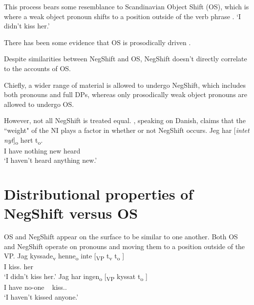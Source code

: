 \documentclass[12pt, letterpaper]{article}
\begin{document}
\ex This process bears some resemblance to Scandinavian Object Shift (OS), which is where a weak object pronoun shifts to a position outside of the verb phrase \citep{holmbergWordOrderSyntactic1986,holmbergRemarksHolmbergGeneralization1999}.
	 
	\glt `I didn't kiss her.'
	\z 

\ex There has been some evidence that OS is prosodically driven \citep{erteschik-shirSoundPatternsSyntax2005,erteschik-shirScandinavianObjectShift2017,erteschik-shirVariationMainlandScandinavian2020,brinkerhoffMATCHINGPhrasesNorwegian2021}. 

\ex Despite similarities between NegShift and OS, NegShift doesn't directly correlate to the accounts of OS. 

\ex Chiefly, a wider range of material is allowed to undergo NegShift, which includes both pronouns and full DPs, whereas only prosodically weak object pronouns are allowed to undergo OS.

\ex However, not all NegShift is treated equal. \citet[65f]{christensenInterfacesNegationSyntax2005}, speaking on Danish, claims that the ``weight" of the NI plays a factor in whether or not NegShift occurs. 
	\ea
	\gll Jeg har [\textit{intet} \textit{nyt}]\textsubscript{o} hørt t\textsubscript{o}.\\
	I have nothing new heard\\
	\glt `I haven't heard anything new.'
	\z
\z 

\section{Distributional properties of NegShift versus OS} \label{sec:ENGELS}

\ea OS and NegShift appear on the surface to be similar to one another. 
\ex Both OS and NegShift operate on pronouns and moving them to a position outside of the VP. 
	\ea \label{ex:OS}
		\gll Jag kyssade\textsubscript{v} henne\textsubscript{o} inte [\textsubscript{VP} t\textsubscript{v} t\textsubscript{o} ] \\
		I kiss.\Pst{} her \Neg{}\\
		\glt `I didn't kiss her.'
	\ex \label{ex:NS}
		\gll Jag har ingen\textsubscript{o} [\textsubscript{VP} kyssat t\textsubscript{o} ]\\
		I have no-one ~ kiss.\Pst{}.\Ptcp{} \\
		\glt `I haven't kissed anyone.'
	\z 
	
\end{document}
